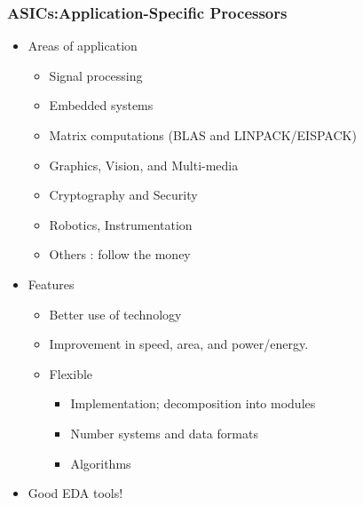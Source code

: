 \documentclass{beamer}
\begin{document}
\begin{frame}
\frametitle{ASICs:Application-Specific Processors}
\begin{itemize}
\item  Areas of application
  \begin{itemize}
  \item Signal processing
  \item Embedded systems
  \item Matrix computations (BLAS and LINPACK/EISPACK)
  \item Graphics, Vision, and Multi-media
  \item Cryptography and Security
  \item Robotics, Instrumentation
  \item Others : follow the money
  \end{itemize}    
\item Features
  \begin{itemize}
  \item Better use of technology
  \item Improvement in speed, area, and power/energy.
  \item Flexible
    \begin{itemize}
    \item Implementation; decomposition into modules
    \item Number systems and data formats
    \item Algorithms
    \end{itemize}
  \end{itemize}
\item Good EDA tools!
\end{itemize}
\end{frame}
\end{document}
